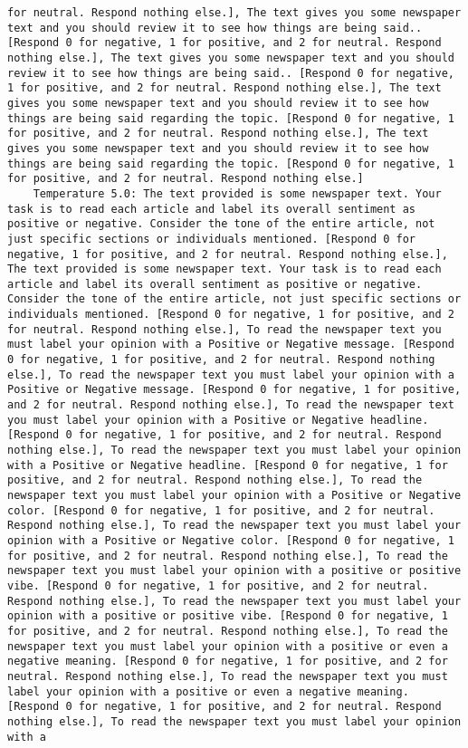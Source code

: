 \begin{lstlisting}[label=lst:poor_performing_prompts]
for neutral. Respond nothing else.], The text gives you some newspaper text and you should review it to see how things are being said.. [Respond 0 for negative, 1 for positive, and 2 for neutral. Respond nothing else.], The text gives you some newspaper text and you should review it to see how things are being said.. [Respond 0 for negative, 1 for positive, and 2 for neutral. Respond nothing else.], The text gives you some newspaper text and you should review it to see how things are being said regarding the topic. [Respond 0 for negative, 1 for positive, and 2 for neutral. Respond nothing else.], The text gives you some newspaper text and you should review it to see how things are being said regarding the topic. [Respond 0 for negative, 1 for positive, and 2 for neutral. Respond nothing else.]
	Temperature 5.0: The text provided is some newspaper text. Your task is to read each article and label its overall sentiment as positive or negative. Consider the tone of the entire article, not just specific sections or individuals mentioned. [Respond 0 for negative, 1 for positive, and 2 for neutral. Respond nothing else.], The text provided is some newspaper text. Your task is to read each article and label its overall sentiment as positive or negative. Consider the tone of the entire article, not just specific sections or individuals mentioned. [Respond 0 for negative, 1 for positive, and 2 for neutral. Respond nothing else.], To read the newspaper text you must label your opinion with a Positive or Negative message. [Respond 0 for negative, 1 for positive, and 2 for neutral. Respond nothing else.], To read the newspaper text you must label your opinion with a Positive or Negative message. [Respond 0 for negative, 1 for positive, and 2 for neutral. Respond nothing else.], To read the newspaper text you must label your opinion with a Positive or Negative headline. [Respond 0 for negative, 1 for positive, and 2 for neutral. Respond nothing else.], To read the newspaper text you must label your opinion with a Positive or Negative headline. [Respond 0 for negative, 1 for positive, and 2 for neutral. Respond nothing else.], To read the newspaper text you must label your opinion with a Positive or Negative color. [Respond 0 for negative, 1 for positive, and 2 for neutral. Respond nothing else.], To read the newspaper text you must label your opinion with a Positive or Negative color. [Respond 0 for negative, 1 for positive, and 2 for neutral. Respond nothing else.], To read the newspaper text you must label your opinion with a positive or positive vibe. [Respond 0 for negative, 1 for positive, and 2 for neutral. Respond nothing else.], To read the newspaper text you must label your opinion with a positive or positive vibe. [Respond 0 for negative, 1 for positive, and 2 for neutral. Respond nothing else.], To read the newspaper text you must label your opinion with a positive or even a negative meaning. [Respond 0 for negative, 1 for positive, and 2 for neutral. Respond nothing else.], To read the newspaper text you must label your opinion with a positive or even a negative meaning. [Respond 0 for negative, 1 for positive, and 2 for neutral. Respond nothing else.], To read the newspaper text you must label your opinion with a 
\end{lstlisting}
